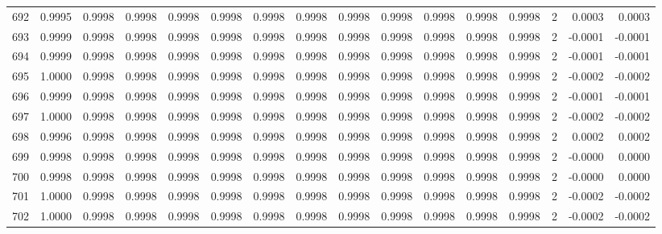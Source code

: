 \begin{tabular}{lrrrrrrrrrrrrrrr}
692 &      0.9995 &  0.9998 &  0.9998 &  0.9998 &  0.9998 &  0.9998 &  0.9998 &  0.9998 &  0.9998 &  0.9998 &   0.9998 &     0.9998 &      2 &                    0.0003 &                     0.0003 \\
693 &      0.9999 &  0.9998 &  0.9998 &  0.9998 &  0.9998 &  0.9998 &  0.9998 &  0.9998 &  0.9998 &  0.9998 &   0.9998 &     0.9998 &      2 &                   -0.0001 &                    -0.0001 \\
694 &      0.9999 &  0.9998 &  0.9998 &  0.9998 &  0.9998 &  0.9998 &  0.9998 &  0.9998 &  0.9998 &  0.9998 &   0.9998 &     0.9998 &      2 &                   -0.0001 &                    -0.0001 \\
695 &      1.0000 &  0.9998 &  0.9998 &  0.9998 &  0.9998 &  0.9998 &  0.9998 &  0.9998 &  0.9998 &  0.9998 &   0.9998 &     0.9998 &      2 &                   -0.0002 &                    -0.0002 \\
696 &      0.9999 &  0.9998 &  0.9998 &  0.9998 &  0.9998 &  0.9998 &  0.9998 &  0.9998 &  0.9998 &  0.9998 &   0.9998 &     0.9998 &      2 &                   -0.0001 &                    -0.0001 \\
697 &      1.0000 &  0.9998 &  0.9998 &  0.9998 &  0.9998 &  0.9998 &  0.9998 &  0.9998 &  0.9998 &  0.9998 &   0.9998 &     0.9998 &      2 &                   -0.0002 &                    -0.0002 \\
698 &      0.9996 &  0.9998 &  0.9998 &  0.9998 &  0.9998 &  0.9998 &  0.9998 &  0.9998 &  0.9998 &  0.9998 &   0.9998 &     0.9998 &      2 &                    0.0002 &                     0.0002 \\
699 &      0.9998 &  0.9998 &  0.9998 &  0.9998 &  0.9998 &  0.9998 &  0.9998 &  0.9998 &  0.9998 &  0.9998 &   0.9998 &     0.9998 &      2 &                   -0.0000 &                     0.0000 \\
700 &      0.9998 &  0.9998 &  0.9998 &  0.9998 &  0.9998 &  0.9998 &  0.9998 &  0.9998 &  0.9998 &  0.9998 &   0.9998 &     0.9998 &      2 &                   -0.0000 &                     0.0000 \\
701 &      1.0000 &  0.9998 &  0.9998 &  0.9998 &  0.9998 &  0.9998 &  0.9998 &  0.9998 &  0.9998 &  0.9998 &   0.9998 &     0.9998 &      2 &                   -0.0002 &                    -0.0002 \\
702 &      1.0000 &  0.9998 &  0.9998 &  0.9998 &  0.9998 &  0.9998 &  0.9998 &  0.9998 &  0.9998 &  0.9998 &   0.9998 &     0.9998 &      2 &                   -0.0002 &                    -0.0002 \\

\end{tabular}
